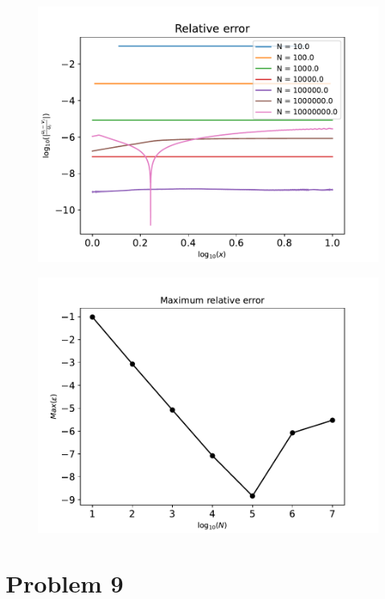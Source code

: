 \documentclass[english,notitlepage]{revtex4-1}  %
\begin{document}
    \begin{figure}[!ht]
        \centering
        \includegraphics[scale=0.7]{rel_error.pdf}
        \caption{}
        \label{rel_error}
    \end{figure}

    \begin{figure}[!ht]
        \centering
        \includegraphics[scale=0.7]{max_error.pdf}
        \caption{}
        \label{max_error}
    \end{figure}


\section*{Problem 9}
\end{document}
